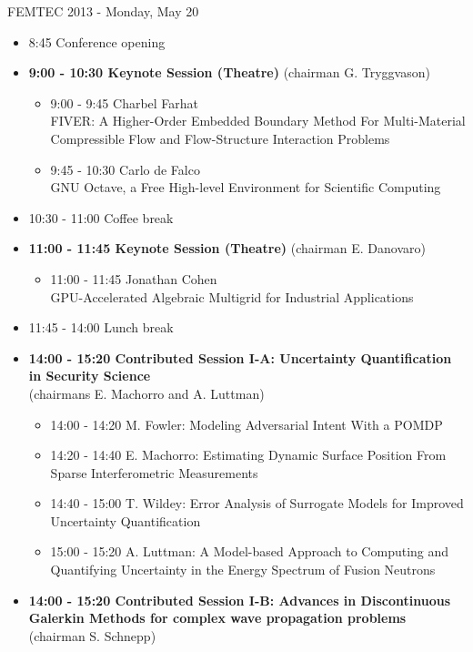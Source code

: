 \documentclass[10pt, A4]{article}%
\begin{document}
\centerline{\huge FEMTEC 2013 - Monday, May 20}
\vspace{4mm}

\begin{itemize}    
  \item 8:45 Conference opening
  \item {\bf 9:00 - 10:30 Keynote Session (Theatre)} (chairman G. Tryggvason) 
  \begin{itemize}
    \item 9:00 - 9:45 {Charbel Farhat}\\{FIVER: A Higher-Order Embedded Boundary Method For Multi-Material Compressible Flow and Flow-Structure Interaction Problems}
    \item 9:45 - 10:30 {Carlo de Falco}\\{GNU Octave, a Free High-level Environment for Scientific Computing}
  \end{itemize}
  \item 10:30 - 11:00 Coffee break
  \item {\bf 11:00 - 11:45 Keynote Session (Theatre)} (chairman E. Danovaro) 
  \begin{itemize}
    \item 11:00 - 11:45 {Jonathan Cohen}\\{GPU-Accelerated Algebraic Multigrid for Industrial Applications}
  \end{itemize}
  \item 11:45 - 14:00 Lunch break      
  \item {\bf 14:00 - 15:20 Contributed Session I-A: Uncertainty Quantification in Security Science} \\(chairmans E. Machorro and A. Luttman) 
  \begin{itemize}
    \item 14:00 - 14:20 {M. Fowler}: {Modeling Adversarial Intent With a POMDP}
    \item 14:20 - 14:40 {E. Machorro}: {Estimating Dynamic Surface Position From Sparse Interferometric Measurements}
    \item 14:40 - 15:00 {T. Wildey}: {Error Analysis of Surrogate Models for Improved Uncertainty Quantification}
    \item 15:00 - 15:20 {A. Luttman}: {A Model-based Approach to Computing and Quantifying Uncertainty in the Energy Spectrum of Fusion Neutrons}
  \end{itemize}
  \item {\bf 14:00 - 15:20 Contributed Session I-B: Advances in Discontinuous Galerkin Methods for complex wave propagation problems} (chairman S. Schnepp)

\end{itemize}
\end{document}
